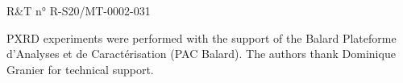 

R\&T n° R-S20/MT-0002-031

PXRD experiments were performed with the support of the Balard Plateforme
d’Analyses et de Caractérisation (PAC Balard). The authors thank Dominique
Granier for technical support.
